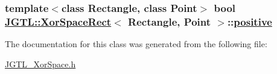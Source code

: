 \hypertarget{class_j_g_t_l_1_1_xor_space_rect_20faa85ce2e1856b7a94a7613f7a6074}{
\subsubsection[positive]{\setlength{\rightskip}{0pt plus 5cm}template$<$class Rectangle, class Point$>$ bool \hyperlink{class_j_g_t_l_1_1_xor_space_rect}{JGTL::Xor\-Space\-Rect}$<$ Rectangle, Point $>$::\hyperlink{class_j_g_t_l_1_1_xor_space_rect_20faa85ce2e1856b7a94a7613f7a6074}{positive}}}
\label{class_j_g_t_l_1_1_xor_space_rect_20faa85ce2e1856b7a94a7613f7a6074}




The documentation for this class was generated from the following file:\begin{CompactItemize}
\item 
\hyperlink{_j_g_t_l___xor_space_8h}{JGTL\_\-Xor\-Space.h}\end{CompactItemize}

